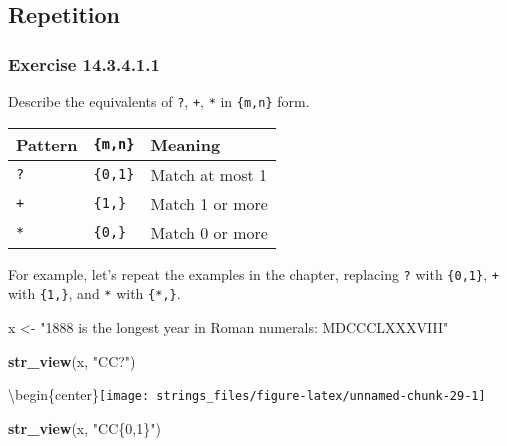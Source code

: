 \documentclass[]{book}
\newenvironment{Shaded}{\begin{snugshade}}{\end{snugshade}}
\newcommand{\KeywordTok}[1]{\textcolor[rgb]{0.13,0.29,0.53}{\textbf{#1}}}
\newcommand{\NormalTok}[1]{#1}
\newcommand{\StringTok}[1]{\textcolor[rgb]{0.31,0.60,0.02}{#1}}
\theoremstyle{plain}
\theoremstyle{remark}
\begin{document}
\hypertarget{repetition}{%
\subsection{Repetition}\label{repetition}}

\hypertarget{exercise-14.3.4.1.1}{%
\subsubsection*{\texorpdfstring{Exercise
{14.3.4.1.1}}{Exercise 14.3.4.1.1}}\label{exercise-14.3.4.1.1}}

Describe the equivalents of \texttt{?}, \texttt{+}, \texttt{*} in
\texttt{\{m,n\}} form.

\begin{longtable}[]{@{}lll@{}}
\toprule
Pattern & \texttt{\{m,n\}} & Meaning\tabularnewline
\midrule
\endhead
\texttt{?} & \texttt{\{0,1\}} & Match at most 1\tabularnewline
\texttt{+} & \texttt{\{1,\}} & Match 1 or more\tabularnewline
\texttt{*} & \texttt{\{0,\}} & Match 0 or more\tabularnewline
\bottomrule
\end{longtable}

For example, let's repeat the examples in the chapter, replacing
\texttt{?} with \texttt{\{0,1\}}, \texttt{+} with \texttt{\{1,\}}, and
\texttt{*} with \texttt{\{*,\}}.

\begin{Shaded}
\begin{Highlighting}[]
\NormalTok{x <-}\StringTok{ "1888 is the longest year in Roman numerals: MDCCCLXXXVIII"}
\end{Highlighting}
\end{Shaded}

\begin{Shaded}
\begin{Highlighting}[]
\KeywordTok{str_view}\NormalTok{(x, }\StringTok{"CC?"}\NormalTok{)}
\end{Highlighting}
\end{Shaded}

\textbackslash{}begin\{center\}\texttt{[image: strings\_files/figure-latex/unnamed-chunk-29-1]}

\begin{Shaded}
\begin{Highlighting}[]
\KeywordTok{str_view}\NormalTok{(x, }\StringTok{"CC\{0,1\}"}\NormalTok{)}
\end{Highlighting}
\end{Shaded}
\end{document}
